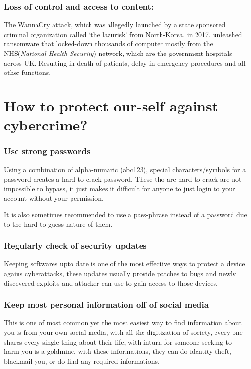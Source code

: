 \documentclass[12pt, a4paper]{article}
\begin{document}
\subsubsection{Loss of control and access to content:}
The WannaCry attack, which was allegedly launched by a state sponsored
criminal organization called `the lazurisk' from North-Korea, in 2017,
unleashed ransomware that locked-down thousands of computer mostly from the
NHS(\emph{National Health Security}) network, which are the government
hospitals across UK. Resulting in death of patients, delay in emergency
procedures and all other functions.%

\section{How to protect our-self against cybercrime?}%
\subsubsection{Use strong passwords}
Using a combination of alpha-numaric (abc123), special characters/symbols for a
password creates a hard to crack password. These tho are hard to crack are not
impossible to bypass, it just makes it difficult for anyone to just login to
your account without your permission.

It is also sometimes recommended to use a pass-phrase instead of a password 
due to the hard to guess nature of them.

\subsubsection{Regularly check of security updates}
Keeping softwares upto date is one of the most effective ways to protect a
device agains cyberattacks, these updates usually provide patches to bugs and 
newly discovered exploits and attacker can use to gain access to those devices.

\subsubsection{Keep most personal information off of social media}
This is one of most common yet the most easiest way to find information about
you is from your own social media, with all the digitization of society, every
one shares every single thing about their life, with inturn for someone seeking
to harm you is a goldmine, with these informations, they can do identity theft,
blackmail you, or do find any required informations.
\end{document}
